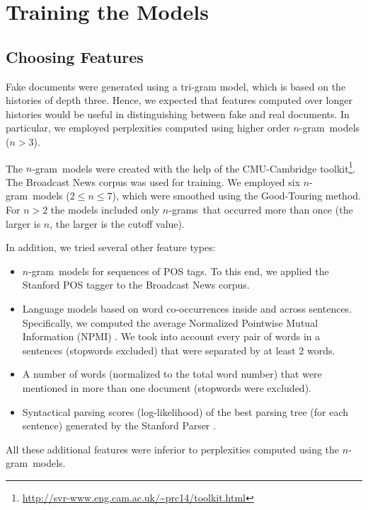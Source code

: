 \documentclass[11pt]{article}
\newcommand{\ngram}{\mbox{$n$-gram }}
\newcommand{\ngrams}{\mbox{$n$-grams }}
\begin{document}
\section{Training the Models}
\subsection{Choosing Features} 
Fake documents were generated using a tri-gram model, 
which is based on the histories of depth three.
Hence, we expected that features computed over longer histories would be useful in distinguishing 
between fake and real documents.
In particular, we employed 
perplexities computed using higher order \ngram models ($n>3$).

The \ngram models were created with the help of the CMU-Cambridge toolkit\footnote{\url{http://svr-www.eng.cam.ac.uk/~prc14/toolkit.html}}.  The Broadcast News corpus was used for training.
We employed six \ngram models ($2 \le n \le 7$), which were smoothed using the Good-Touring method.
For $n>2$ the models included only \ngrams that occurred more than once (the larger is $n$, the larger is the cutoff value).

In addition, we tried several other feature types:
\begin{itemize}
\item \ngram models for sequences of POS tags. To this end, we applied the Stanford POS tagger
to the Broadcast News corpus.
\item Language models based on word co-occurrences inside and across sentences.  
Specifically, we computed the average Normalized Pointwise Mutual Information (NPMI) \cite{Manning:1999}.
We took into account every pair of words in a sentences (stopwords excluded) 
that were separated by at least 2 words.
\item A number of words (normalized to the total word number) that were mentioned in more than one document (stopwords were excluded).
\item Syntactical parsing scores (log-likelihood) of the best parsing tree (for each sentence) generated by the Stanford Parser \cite{Klein03}. 
\end{itemize}
All these additional features were inferior to perplexities computed using the \ngram models.
\end{document}

